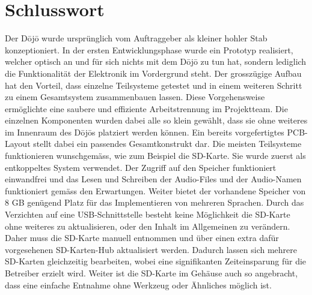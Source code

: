 \section{Schlusswort} \label{sec:schlusswort}

Der Dōjō wurde ursprünglich vom Auftraggeber als kleiner hohler Stab konzeptioniert. In der ersten Entwicklungsphase wurde ein Prototyp realisiert, welcher optisch an und für sich nichts mit dem Dōjō zu tun hat, sondern lediglich die Funktionalität der Elektronik im Vordergrund steht. Der grosszügige Aufbau hat den Vorteil, dass einzelne Teilsysteme getestet und in einem weiteren Schritt zu einem Gesamtsystem zusammenbauen lassen. Diese Vorgehensweise ermöglichte eine saubere und effiziente Arbeitstrennung im Projektteam. Die einzelnen Komponenten wurden dabei alle so klein gewählt, dass sie ohne weiteres im Innenraum des Dōjōs platziert werden können. Ein bereits vorgefertigtes PCB-Layout stellt dabei ein passendes Gesamtkonstrukt dar. Die meisten Teilsysteme funktionieren wunschgemäss, wie zum Beispiel die SD-Karte. Sie wurde zuerst als entkoppeltes System verwendet. Der Zugriff auf den Speicher funktioniert einwandfrei und das Lesen und Schreiben der Audio-Files und der Audio-Namen funktioniert gemäss den Erwartungen. Weiter bietet der vorhandene Speicher von 8 GB genügend Platz für das Implementieren von mehreren Sprachen. Durch das Verzichten auf eine USB-Schnittstelle besteht keine Möglichkeit die SD-Karte ohne weiteres zu aktualisieren, oder den Inhalt im Allgemeinen zu verändern. Daher muss die SD-Karte manuell entnommen und über einen extra dafür vorgesehenen SD-Karten-Hub aktualisiert werden. Dadurch lassen sich mehrere SD-Karten gleichzeitig bearbeiten, wobei eine signifikanten Zeiteinsparung für die Betreiber erzielt wird. Weiter ist die SD-Karte im Gehäuse auch so angebracht, dass eine einfache Entnahme ohne Werkzeug oder Ähnliches möglich ist.
